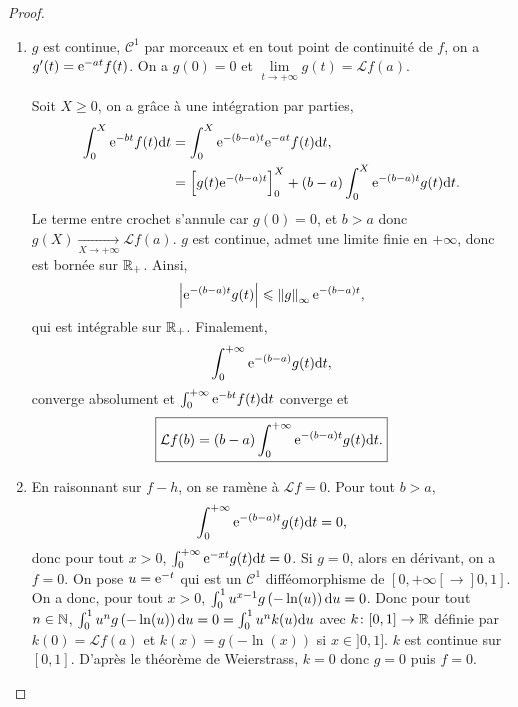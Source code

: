 \documentclass[12pt]{article}
\begin{document}
\begin{proof}
    \phantom{}
    \begin{enumerate}
        \item $g$ est continue, $\mathcal{C}^{1}$ par morceaux et en tout point de continuité de $f$, on a $g'(t)=\mathrm{e}^{-at}f(t)$. On a $g(0)=0$ et $\lim\limits_{t\to+\infty}g(t)=\mathcal{L}f(a)$. 
        
        Soit $X\geqslant0$, on a grâce à une intégration par parties,
        \begin{align*}
            \int_{0}^{X}\mathrm{e}^{-bt}f(t)\mathrm{d} t
            &=\int_{0}^{X}\mathrm{e}^{-(b-a)t}\mathrm{e}^{-at}f(t)\mathrm{d} t,\\
            &=\left[g(t)\mathrm{e}^{-(b-a)t}\right]_{0}^{X}+(b-a)\int_{0}^{X}\mathrm{e}^{-(b-a)t}g(t)\mathrm{d} t.
        \end{align*}
        Le terme entre crochet s'annule car $g(0)=0$, et $b>a$ donc $g(X)\xrightarrow[X\to+\infty]{}\mathcal{L}f(a)$. $g$ est continue, admet une limite finie en $+\infty$, donc est bornée sur $\mathbb{R}_{+}$. Ainsi,
        \begin{equation*}
            \left\lvert\mathrm{e}^{-(b-a)t}g(t)\right\rvert\leqslant\left\lVert g\right\rVert_{\infty}\mathrm{e}^{-(b-a)t},
        \end{equation*}
        qui est intégrable sur $\mathbb{R}_{+}$. Finalement, 
        \begin{equation*}
            \int_{0}^{+\infty}\mathrm{e}^{-(b-a)}g(t)\mathrm{d} t,    
        \end{equation*}
        converge absolument et $\int_{0}^{+\infty}\mathrm{e}^{-bt}f(t)\mathrm{d} t$ converge et 
        \begin{equation*}
            \boxed{
                \mathcal{L}f(b)=(b-a)\int_{0}^{+\infty}\mathrm{e}^{-(b-a)t}g(t)\mathrm{d} t.
            }
        \end{equation*}

        \item En raisonnant sur $f-h$, on se ramène à $\mathcal{L}f=0$. Pour tout $b>a$,
        \begin{equation*}
            \int_{0}^{+\infty}\mathrm{e}^{-(b-a)t}g(t)\mathrm{d} t=0,    
        \end{equation*}
        donc pour tout $x>0$, $\int_{0}^{+\infty}\mathrm{e}^{-xt}g(t)\mathrm{d} t=0$. Si $g=0$, alors en dérivant, on a $f=0$. On pose $u=\mathrm{e}^{-t}$ qui est un $\mathcal{C}^{1}$ difféomorphisme de $[0,+\infty[\to]0,1]$. On a donc, pour tout $x>0$, $\int_{0}^{1}u^{x-1}g\left(-\ln(u)\right)\mathrm{d} u=0$. Donc pour tout $n\in\mathbb{N}$, $\int_{0}^{1}u^{n}g\left(-\ln(u)\right)\mathrm{d} u=0=\int_{0}^{1}u^{n}k(u)\mathrm{d} u$ avec $k\colon[0,1]\to\mathbb{R}$ définie par $k(0)=\mathcal{L}f(a)$ et $k(x)=g\left(-\ln(x)\right)$ si $x\in]0,1]$. $k$ est continue sur $[0,1]$. D'après le théorème de Weierstrass, $k=0$ donc $g=0$ puis $f=0$.
    \end{enumerate}
\end{proof}
\end{document}
